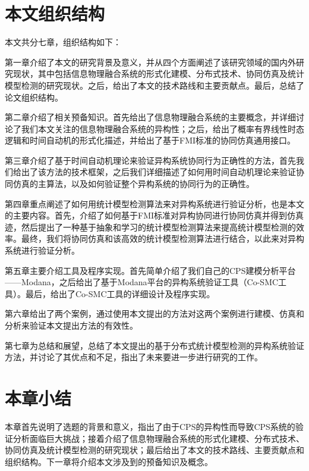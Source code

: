 \section{本文组织结构}
本文共分七章，组织结构如下：

第一章介绍了本文的研究背景及意义，并从四个方面阐述了该研究领域的国内外研究现状，其中包括信息物理融合系统的形式化建模、分布式技术、协同仿真及统计模型检测的研究现状。之后，给出了本文的技术路线和主要贡献点。最后，总结了论文组织结构。

第二章介绍了相关预备知识。首先给出了信息物理融合系统的主要概念，并详细讨论了我们本文关注的信息物理融合系统的异构性；之后，给出了概率有界线性时态逻辑和时间自动机的形式化描述，并给出了基于FMI标准的协同仿真通用接口。

第三章介绍了基于时间自动机理论来验证异构系统协同行为正确性的方法，首先我们给出了该方法的技术框架，之后我们详细描述了如何用时间自动机理论来验证协同仿真的主算法，以及如何验证整个异构系统的协同行为的正确性。

第四章重点阐述了如何用统计模型检测算法来对异构系统进行验证分析，也是本文的主要内容。首先，介绍了如何基于FMI标准对异构协同进行协同仿真并得到仿真迹，然后提出了一种基于抽象和学习的统计模型检测算法来提高统计模型检测的效率。最终，我们将协同仿真和该高效的统计模型检测算法进行结合，以此来对异构系统进行验证分析。

第五章主要介绍工具及程序实现。首先简单介绍了我们自己的CPS建模分析平台——Modana，之后给出了基于Modana平台的异构系统验证工具（Co-SMC工具）。最后，给出了Co-SMC工具的详细设计及程序实现。

第六章给出了两个案例，通过使用本文提出的方法对这两个案例进行建模、仿真和分析来验证本文提出方法的有效性。

第七章为总结和展望，总结了本文提出的基于分布式统计模型检测的异构系统验证方法，并讨论了其优点和不足，指出了未来要进一步进行研究的工作。
\section{本章小结}
本章首先说明了选题的背景和意义，指出了由于CPS的异构性而导致CPS系统的验证分析面临巨大挑战；接着介绍了信息物理融合系统的形式化建模、分布式技术、协同仿真及统计模型检测的研究现状；最后给出了本文的技术路线、主要贡献点和组织结构。下一章将介绍本文涉及到的预备知识及概念。
